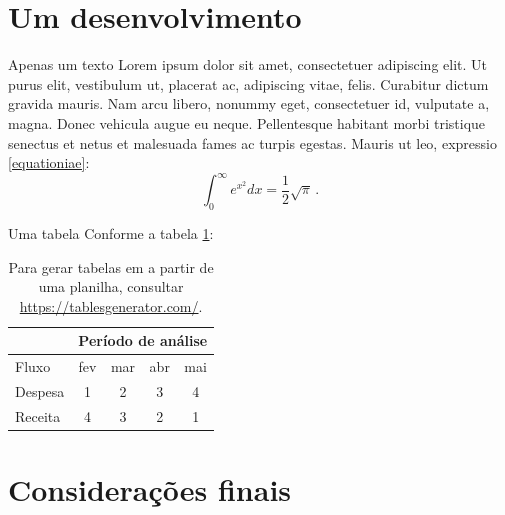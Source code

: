 \documentclass[aspectratio=169]{beamer}
\begin{document}
\section{Um desenvolvimento}

\begin{frame}{Apenas um texto}
Lorem ipsum dolor sit amet, consectetuer adipiscing elit. Ut purus elit, vestibulum ut, placerat ac, adipiscing vitae, felis. Curabitur dictum gravida mauris. Nam arcu libero, nonummy eget, consectetuer id, vulputate a, magna. Donec vehicula augue eu neque. Pellentesque habitant morbi tristique senectus et netus et malesuada fames ac turpis egestas. Mauris ut leo, expressio \eqref{equationiae}: 
\begin{equation}
\int_{0}^{\infty} e^{x^{2}}dx = \frac{1}{2}\sqrt{\pi} \,.
\label{equationiae}
\end{equation}

\end{frame}
\begin{frame}{Uma tabela}
Conforme a tabela \ref{tabela:001}:
\begin{table}[]
	\caption{Para gerar tabelas em a partir de uma planilha, consultar \url{https://tablesgenerator.com/}.}
	\label{tabela:001}
	\begin{tabular}{|l|c|c|c|c|}
		\hline
		& \multicolumn{4}{c|}{Período de análise} \\ \hline
		Fluxo   & fev      & mar      & abr     & mai     \\ \hline
		Despesa &    1     &  2       &  3      &  4      \\ \hline
		Receita &    4     &  3       &  2      &  1      \\ \hline
	\end{tabular}
\end{table}
\end{frame}

\section{Considerações finais}
\end{document}
